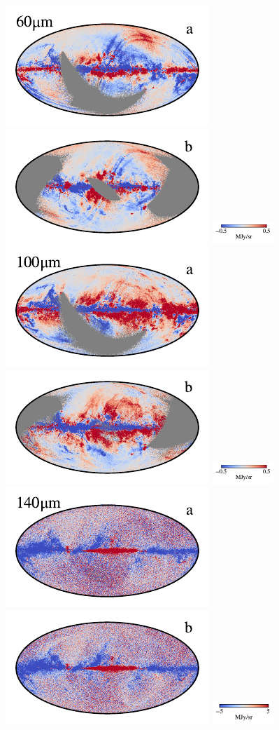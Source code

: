 \documentclass[twocolumn]{aa}
\begin{document}
\begin{figure}[t]
    \includegraphics[width=0.22\linewidth]{figs/compare_zodi_res/cosmoglobe_res_07a.pdf}%
    \includegraphics[width=0.22\linewidth]{figs/compare_zodi_res/cosmoglobe_res_07b.pdf}%
    \includegraphics[width=23mm,angle=90]{figs/compare_zodi_res/cbar_07.pdf}\hspace*{3mm}
    \includegraphics[width=0.22\linewidth]{figs/compare_zodi_res/cosmoglobe_res_08a.pdf}%
    \includegraphics[width=0.22\linewidth]{figs/compare_zodi_res/cosmoglobe_res_08b.pdf}%
    \includegraphics[width=23mm,angle=90]{figs/compare_zodi_res/cbar_08.pdf}\\
    \includegraphics[width=0.22\linewidth]{figs/compare_zodi_res/cosmoglobe_res_09a.pdf}%
    \includegraphics[width=0.22\linewidth]{figs/compare_zodi_res/cosmoglobe_res_09b.pdf}%
    \includegraphics[width=23mm,angle=90]{figs/compare_zodi_res/cbar_09.pdf}\hspace*{3mm}

\end{figure}
\end{document}
